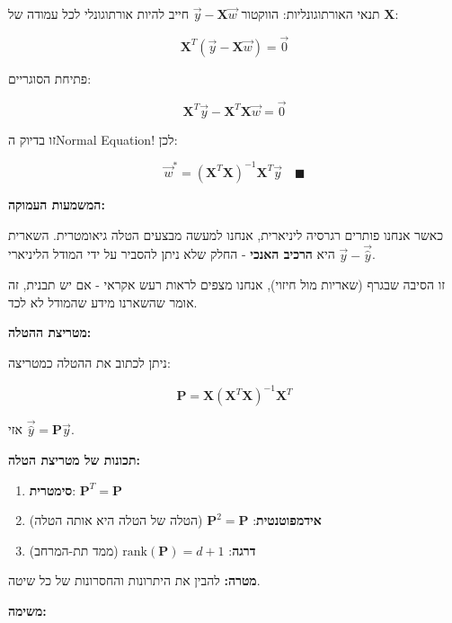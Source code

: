 תנאי האורתוגונליות: הווקטור $\vec{y} - \mathbf{X}\vec{w}$ חייב להיות אורתוגונלי לכל עמודה של $\mathbf{X}$:

\begin{equation}
\mathbf{X}^T(\vec{y} - \mathbf{X}\vec{w}) = \vec{0}
\end{equation}

פתיחת הסוגריים:

\begin{equation}
\mathbf{X}^T\vec{y} - \mathbf{X}^T\mathbf{X}\vec{w} = \vec{0}
\end{equation}

זו בדיוק ה\en{-}Normal Equation! לכן:

\begin{equation}
\vec{w}^* = (\mathbf{X}^T\mathbf{X})^{-1}\mathbf{X}^T\vec{y} \quad \blacksquare
\end{equation}

\textbf{המשמעות העמוקה:}

כאשר אנחנו פותרים רגרסיה ליניארית, אנחנו למעשה מבצעים הטלה גיאומטרית. השארית $\vec{y} - \vec{\hat{y}}$ היא \textbf{הרכיב האנכי} - החלק שלא ניתן להסביר על ידי המודל הליניארי.

זו הסיבה שבגרף  (שאריות מול חיזוי), אנחנו מצפים לראות רעש אקראי - אם יש תבנית, זה אומר שהשארנו מידע שהמודל לא לכד.

\textbf{מטריצת ההטלה:}

ניתן לכתוב את ההטלה כמטריצה:

\begin{equation}
\mathbf{P} = \mathbf{X}(\mathbf{X}^T\mathbf{X})^{-1}\mathbf{X}^T
\end{equation}

אזי $\vec{\hat{y}} = \mathbf{P}\vec{y}$.

\textbf{תכונות של מטריצת הטלה:}

\begin{enumerate}
\item \textbf{סימטרית}: $\mathbf{P}^T = \mathbf{P}$
\item \textbf{אידמפוטנטית}: $\mathbf{P}^2 = \mathbf{P}$ (הטלה של הטלה היא אותה הטלה)
\item \textbf{דרגה}: $\text{rank}(\mathbf{P}) = d+1$ (ממד תת-המרחב)
\end{enumerate}


\textbf{מטרה:} להבין את היתרונות והחסרונות של כל שיטה.

\textbf{משימה:}

